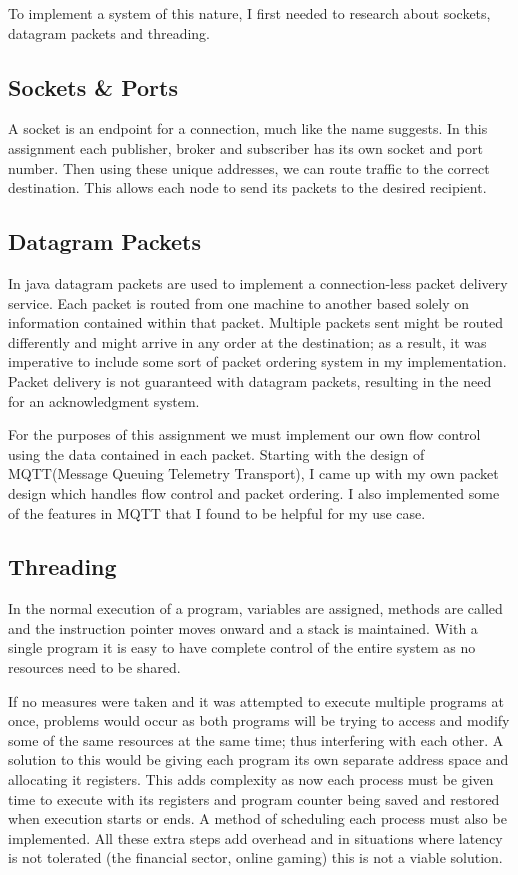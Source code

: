 \documentclass{article}
\begin{document}
To implement a system of this nature, I first needed to research about sockets, datagram packets and threading.

\pagebreak

\subsection{Sockets {\&} Ports}
A socket is an endpoint for a connection, much like the name suggests. In this assignment each publisher, broker and subscriber has its own socket and port number. Then using these unique addresses, we can route traffic to the correct destination. This allows each node to send its packets to the desired recipient.

\subsection{Datagram Packets}

In java datagram packets are used to implement a connection-less packet delivery service. Each packet is routed from one machine to another based solely on information contained within that packet. Multiple packets sent might be routed differently and might arrive in any order at the destination; as a result, it was imperative to include some sort of packet ordering system in my implementation. Packet delivery is not guaranteed with datagram packets, resulting in the need for an acknowledgment system. 

For the purposes of this assignment we must implement our own flow control using the data contained in each packet. Starting with the design of MQTT(Message Queuing Telemetry Transport), I came up with my own packet design which handles flow control and packet ordering. I also implemented some of the features in MQTT that I found to be helpful for my use case.


\subsection{Threading}

In the normal execution of a program, variables are assigned, methods are called and the instruction pointer moves onward and a stack is maintained. With a single program it is easy to have complete control of the entire system as no resources need to be shared. 

If no measures were taken and it was attempted to execute multiple programs at once, problems would occur as both programs will be trying to access and modify some of the same resources at the same time; thus interfering with each other. A solution to this would be giving each program its own separate address space and allocating it registers. This adds complexity as now each process must be given time to execute with its registers and program counter being saved and restored when execution starts or ends. A method of scheduling each process must also be implemented. All these extra steps add overhead and in situations where latency is not tolerated (the financial sector, online gaming) this is not a viable solution.
\end{document}
